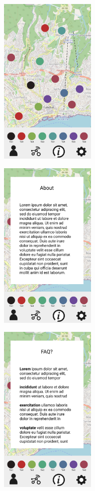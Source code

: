 \begin{figure}
    \centering
    \begin{subfigure}{0.33\textwidth}
        \centering
        \includegraphics[width=130pt]{../assets/images/low_homepage.png}
        \caption{}
        \label{fig:mediumhome}
    \end{subfigure}%
    \begin{subfigure}{0.33\textwidth}
        \centering
        \includegraphics[width=130pt]{../assets/images/low_about.png}
        \caption{}
        \label{fig:mediumabout}
    \end{subfigure}%
    \begin{subfigure}{0.33\textwidth}
        \centering
        \includegraphics[width=130pt]{../assets/images/low_more_info.png}

\end{subfigure}
\end{figure}
